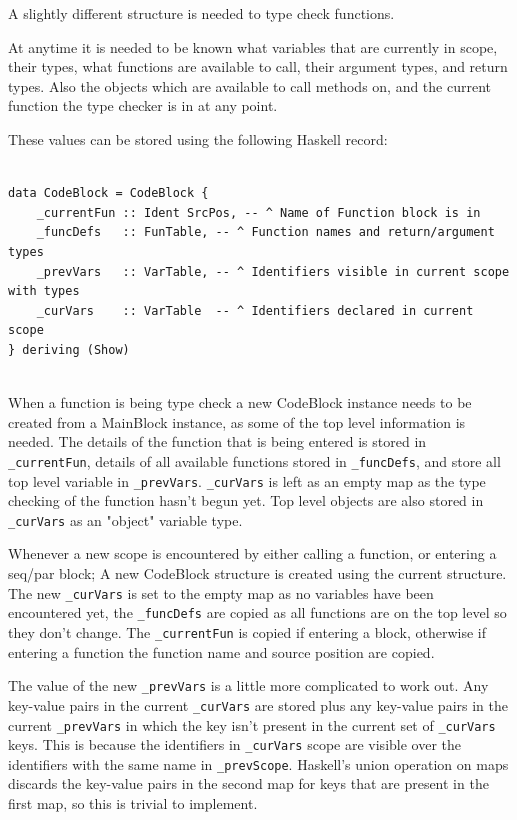 A slightly different structure is needed to type check functions.

At anytime it is needed to be known what variables that are currently in scope, their types,
what functions are available to call, their argument types, and return types. Also the
objects which are available to call methods on, and the current function the type checker
is in at any point.

These values can be stored using the following Haskell record: 

\begin{lstlisting}[style=myHaskell]

data CodeBlock = CodeBlock {
    _currentFun :: Ident SrcPos, -- ^ Name of Function block is in
    _funcDefs   :: FunTable, -- ^ Function names and return/argument types
    _prevVars   :: VarTable, -- ^ Identifiers visible in current scope with types
    _curVars    :: VarTable  -- ^ Identifiers declared in current scope
} deriving (Show)


\end{lstlisting}

When a function is being type check a new CodeBlock instance needs to be
created from a MainBlock instance, as some of the top level information is needed.
The details of the function that is being entered is stored in \texttt{\_currentFun}, 
details of all available functions stored in \texttt{\_funcDefs}, and store all
top level variable in \texttt{\_prevVars}. \texttt{\_curVars} is left as an empty map as the
type checking of the function hasn't begun yet. Top level objects are also
stored in \texttt{\_curVars} as an "object" variable type.

Whenever a new scope is encountered by either calling a function, or entering a seq/par block;
A new CodeBlock structure is created using the current structure. The new \texttt{\_curVars}
is set to the empty map as no variables have been encountered yet, the \texttt{\_funcDefs}
are copied as all functions are on the top level so they don't change. The \texttt{\_currentFun}
is copied if entering a block, otherwise if entering a function the function name
and source position are copied. 

The value of the new \texttt{\_prevVars} is a little more complicated to work out.
Any key-value pairs in the current \texttt{\_curVars} are stored plus any key-value pairs in the 
current \texttt{\_prevVars} in which the key isn't present in the current 
set of \texttt{\_curVars} keys. This is because
the identifiers in \texttt{\_curVars} scope are visible over the identifiers with
the same name in \texttt{\_prevScope}. Haskell's union operation on maps
discards the key-value pairs in the second map for keys that are
present in the first map, so this is trivial to implement.

